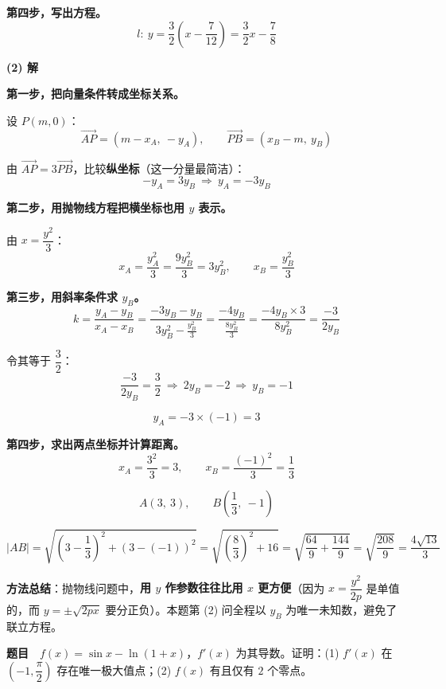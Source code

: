 \textbf{第四步，写出方程。}
\[l:\ y=\frac32\left(x-\frac7{12}\right)=\frac32x-\frac78\]


\par\medskip

\textbf{(2) 解}

\textbf{第一步，把向量条件转成坐标关系。}

设 $P(m,0)$：
\[\overrightarrow{AP}=\left(m-x_A,\ -y_A\right),\qquad \overrightarrow{PB}=\left(x_B-m,\ y_B\right)\]

由 $\overrightarrow{AP}=3\overrightarrow{PB}$，比较\textbf{纵坐标}（这一分量最简洁）：
\[-y_A=3y_B\ \Longrightarrow\ y_A=-3y_B\]

\textbf{第二步，用抛物线方程把横坐标也用 $y$ 表示。}

由 $x=\dfrac{y^{2}}3$：
\[x_A=\frac{y_A^{2}}3=\frac{9y_B^{2}}3=3y_B^{2},\qquad x_B=\frac{y_B^{2}}3\]

\textbf{第三步，用斜率条件求 $y_B$。}
\[k=\frac{y_A-y_B}{x_A-x_B}=\frac{-3y_B-y_B}{3y_B^{2}-\frac{y_B^{2}}3}=\frac{-4y_B}{\frac{8y_B^{2}}3}=\frac{-4y_B\times3}{8y_B^{2}}=\frac{-3}{2y_B}\]

令其等于 $\dfrac32$：
\[\frac{-3}{2y_B}=\frac32\ \Longrightarrow\ 2y_B=-2\ \Longrightarrow\ y_B=-1\]

\[y_A=-3\times(-1)=3\]

\textbf{第四步，求出两点坐标并计算距离。}
\[x_A=\frac{3^{2}}3=3,\qquad x_B=\frac{(-1)^{2}}3=\frac13\]

\[A(3,\ 3),\qquad B\left(\frac13,\ -1\right)\]

\[|AB|=\sqrt{\left(3-\frac13\right)^{2}+\left(3-(-1)\right)^{2}}=\sqrt{\left(\frac83\right)^{2}+16}=\sqrt{\frac{64}9+\frac{144}9}=\sqrt{\frac{208}9}=\frac{4\sqrt{13}}3\]


\begin{gktip}
\textbf{方法总结}：抛物线问题中，\textbf{用 $y$ 作参数往往比用 $x$ 更方便}（因为 $x=\dfrac{y^{2}}{2p}$ 是单值的，而 $y=\pm\sqrt{2px}$ 要分正负）。本题第 (2) 问全程以 $y_B$ 为唯一未知数，避免了联立方程。
\end{gktip}

\par\medskip


\textbf{题目}　$f(x)=\sin x-\ln(1+x)$，$f'(x)$ 为其导数。证明：(1) $f'(x)$ 在 $\left(-1,\dfrac\pi2\right)$ 存在唯一极大值点；(2) $f(x)$ 有且仅有 $2$ 个零点。

